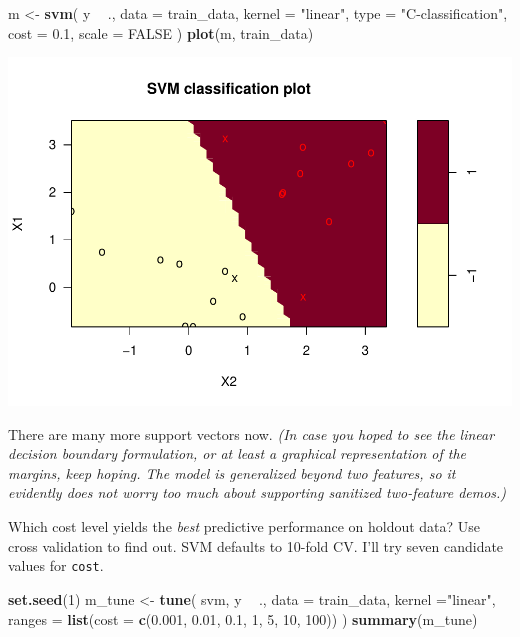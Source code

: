 \documentclass[
]{book}
\newenvironment{Shaded}{\begin{snugshade}}{\end{snugshade}}
\newcommand{\DataTypeTok}[1]{\textcolor[rgb]{0.13,0.29,0.53}{#1}}
\newcommand{\DecValTok}[1]{\textcolor[rgb]{0.00,0.00,0.81}{#1}}
\newcommand{\FloatTok}[1]{\textcolor[rgb]{0.00,0.00,0.81}{#1}}
\newcommand{\KeywordTok}[1]{\textcolor[rgb]{0.13,0.29,0.53}{\textbf{#1}}}
\newcommand{\NormalTok}[1]{#1}
\newcommand{\OperatorTok}[1]{\textcolor[rgb]{0.81,0.36,0.00}{\textbf{#1}}}
\newcommand{\OtherTok}[1]{\textcolor[rgb]{0.56,0.35,0.01}{#1}}
\newcommand{\StringTok}[1]{\textcolor[rgb]{0.31,0.60,0.02}{#1}}
\begin{document}
\begin{Shaded}
\begin{Highlighting}[]
\NormalTok{m <-}\StringTok{ }\KeywordTok{svm}\NormalTok{(}
\NormalTok{  y }\OperatorTok{~}\StringTok{ }\NormalTok{., }
  \DataTypeTok{data =}\NormalTok{ train_data,}
  \DataTypeTok{kernel =} \StringTok{"linear"}\NormalTok{,}
  \DataTypeTok{type =} \StringTok{"C-classification"}\NormalTok{,  }
  \DataTypeTok{cost =} \FloatTok{0.1}\NormalTok{,}
  \DataTypeTok{scale =} \OtherTok{FALSE}
\NormalTok{)}
\KeywordTok{plot}\NormalTok{(m, train_data)}
\end{Highlighting}
\end{Shaded}

\includegraphics{data-sci_files/figure-latex/unnamed-chunk-101-1.pdf}

There are many more support vectors now. \emph{(In case you hoped to see the linear decision boundary formulation, or at least a graphical representation of the margins, keep hoping. The model is generalized beyond two features, so it evidently does not worry too much about supporting sanitized two-feature demos.)}

Which cost level yields the \emph{best} predictive performance on holdout data? Use cross validation to find out. SVM defaults to 10-fold CV. I'll try seven candidate values for \texttt{cost}.

\begin{Shaded}
\begin{Highlighting}[]
\KeywordTok{set.seed}\NormalTok{(}\DecValTok{1}\NormalTok{)}
\NormalTok{m_tune <-}\StringTok{ }\KeywordTok{tune}\NormalTok{(}
\NormalTok{  svm,}
\NormalTok{  y }\OperatorTok{~}\StringTok{ }\NormalTok{.,}
  \DataTypeTok{data =}\NormalTok{ train_data,}
  \DataTypeTok{kernel =}\StringTok{"linear"}\NormalTok{,}
  \DataTypeTok{ranges =} \KeywordTok{list}\NormalTok{(}\DataTypeTok{cost =} \KeywordTok{c}\NormalTok{(}\FloatTok{0.001}\NormalTok{, }\FloatTok{0.01}\NormalTok{, }\FloatTok{0.1}\NormalTok{, }\DecValTok{1}\NormalTok{, }\DecValTok{5}\NormalTok{, }\DecValTok{10}\NormalTok{, }\DecValTok{100}\NormalTok{))}
\NormalTok{)}
\KeywordTok{summary}\NormalTok{(m_tune)}
\end{Highlighting}
\end{Shaded}
\end{document}
